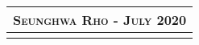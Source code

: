 \documentclass[10pt]{article}
\begin{document}
\begin{center}
\begin{tabular}{llllr}
\multicolumn{5}{r}{\textsc{Seunghwa Rho - July 2020}} \\ \hline
\multicolumn{5}{p{500pt}}{}\\
\end{tabular}

\begin{tabular}{llllr}

\end{tabular}
\end{center}
\end{document}
